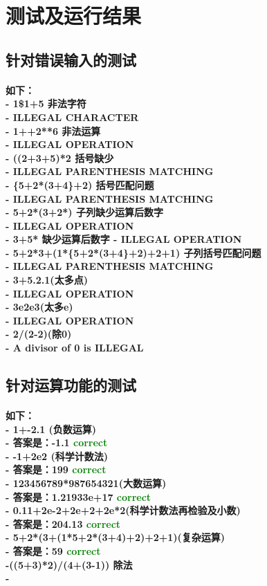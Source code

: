 \documentclass[UTF8]{ctexart}
\begin{document}
\section{测试及运行结果}
\subsection{针对错误输入的测试}
\paragraph{
如下：\\
- 1\$1+5  非法字符\\
- ILLEGAL CHARACTER \\
- 1++2**6 非法运算\\
- ILLEGAL OPERATION \\
- ((2+3+5)*2 括号缺少\\
- ILLEGAL PARENTHESIS MATCHING \\
- \{5+2*(3+4\}+2) 括号匹配问题\\
- ILLEGAL PARENTHESIS MATCHING \\
- 5+2*(3+2*) 子列缺少运算后数字\\
- ILLEGAL OPERATION \\
- 3+5* 缺少运算后数字
- ILLEGAL OPERATION\\
- 5+2*3+(1*\{5+2*(3+4\}+2)+2+1) 子列括号匹配问题\\
- ILLEGAL PARENTHESIS MATCHING \\
- 3+5.2.1(太多点)\\
- ILLEGAL OPERATION\\
- 3e2e3(太多e)\\
- ILLEGAL OPERATION \\
- 2/(2-2)(除0)\\
- A divisor of 0 is ILLEGAL
}
\subsection{针对运算功能的测试}
\paragraph{
如下：\\
- 1+-2.1 (负数运算)\\
- 答案是：-1.1 \textcolor{green}{correct}\\
- -1+2e2 (科学计数法)\\
- 答案是：199 \textcolor{green}{correct}\\
- 123456789*987654321(大数运算)\\
- 答案是：1.21933e+17 \textcolor{green}{correct}\\
- 0.11+2e-2+2e+2+2e*2(科学计数法再检验及小数)\\
- 答案是：204.13 \textcolor{green}{correct}\\
- 5+2*(3+(1*5+2*(3+4)+2)+2+1)(复杂运算)\\
- 答案是：59 \textcolor{green}{correct}\\
-((5+3)*2)/(4+(3-1)) {除法}\\
- 
}
\end{document}
